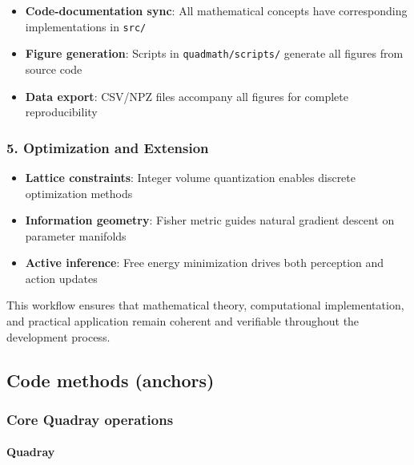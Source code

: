 \documentclass[
  10pt,
]{article}
\newcommand{\passthrough}[1]{#1}
\providecommand{\tightlist}{%
  \setlength{\itemsep}{0pt}\setlength{\parskip}{0pt}}
\renewcommand{\texttt}[1]{%
    \colorbox{codebg}{\color{codefg}\ttfamily #1}%
}
\begin{document}
\begin{itemize}
\tightlist
\item
  \textbf{Code-documentation sync}: All mathematical concepts have
  corresponding implementations in \passthrough{\lstinline!src/!}
\item
  \textbf{Figure generation}: Scripts in
  \passthrough{\lstinline!quadmath/scripts/!} generate all figures from
  source code
\item
  \textbf{Data export}: CSV/NPZ files accompany all figures for complete
  reproducibility
\end{itemize}

\hypertarget{optimization-and-extension}{%
\subsubsection{5. Optimization and
Extension}\label{optimization-and-extension}}

\begin{itemize}
\tightlist
\item
  \textbf{Lattice constraints}: Integer volume quantization enables
  discrete optimization methods
\item
  \textbf{Information geometry}: Fisher metric guides natural gradient
  descent on parameter manifolds
\item
  \textbf{Active inference}: Free energy minimization drives both
  perception and action updates
\end{itemize}

This workflow ensures that mathematical theory, computational
implementation, and practical application remain coherent and verifiable
throughout the development process.

\hypertarget{code-methods-anchors}{%
\subsection{Code methods (anchors)}\label{code-methods-anchors}}

\hypertarget{code:core_quadray}{%
\subsubsection{Core Quadray operations}\label{code:core_quadray}}

\hypertarget{code:Quadray}{%
\paragraph{\texorpdfstring{\texttt{Quadray}}{Quadray}}\label{code:Quadray}}
\end{document}
